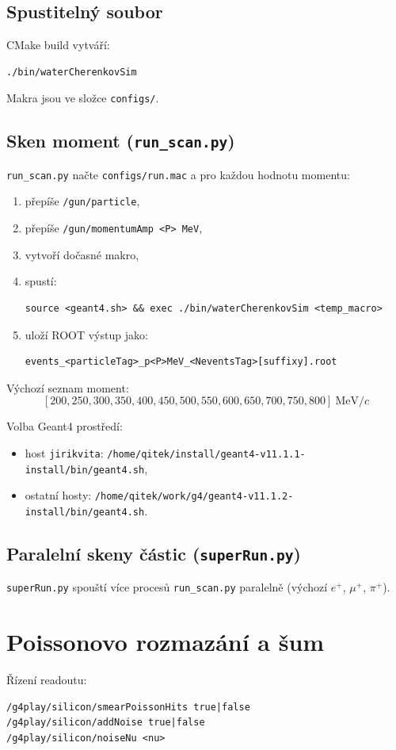\documentclass[11pt,a4paper]{article}
\begin{document}
\subsection{Spustitelný soubor}
CMake build vytváří:
\begin{verbatim}
./bin/waterCherenkovSim
\end{verbatim}
Makra jsou ve složce \texttt{configs/}.

\subsection{Sken moment (\texttt{run\_scan.py})}
\texttt{run\_scan.py} načte \texttt{configs/run.mac} a pro každou hodnotu momentu:
\begin{enumerate}
  \item přepíše \texttt{/gun/particle},
  \item přepíše \texttt{/gun/momentumAmp <P> MeV},
  \item vytvoří dočasné makro,
  \item spustí:
\begin{verbatim}
source <geant4.sh> && exec ./bin/waterCherenkovSim <temp_macro>
\end{verbatim}
  \item uloží ROOT výstup jako:
\begin{verbatim}
events_<particleTag>_p<P>MeV_<NeventsTag>[suffixy].root
\end{verbatim}
\end{enumerate}

Výchozí seznam moment:
\[
[200,250,300,350,400,450,500,550,600,650,700,750,800]\ \text{MeV}/c
\]

Volba Geant4 prostředí:
\begin{itemize}
  \item host \texttt{jirikvita}: \texttt{/home/qitek/install/geant4-v11.1.1-install/bin/geant4.sh},
  \item ostatní hosty: \texttt{/home/qitek/work/g4/geant4-v11.1.2-install/bin/geant4.sh}.
\end{itemize}

\subsection{Paralelní skeny částic (\texttt{superRun.py})}
\texttt{superRun.py} spouští více procesů \texttt{run\_scan.py} paralelně
(výchozí \(e^+\), \(\mu^+\), \(\pi^+\)).

\section{Poissonovo rozmazání a šum}
Řízení readoutu:
\begin{verbatim}
/g4play/silicon/smearPoissonHits true|false
/g4play/silicon/addNoise true|false
/g4play/silicon/noiseNu <nu>
\end{verbatim}
\end{document}
